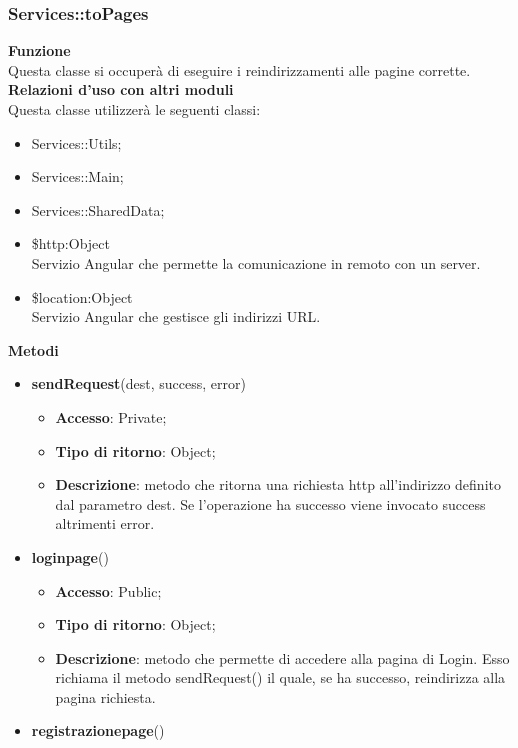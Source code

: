 \subsubsection{Services::toPages}{
		\label{sub:servicestoPages}
		\textbf{Funzione}\\
		\indent Questa classe si occuperà di eseguire i reindirizzamenti alle pagine corrette.\\
		\textbf{Relazioni d'uso con altri moduli}\\
		\indent Questa classe utilizzerà le seguenti classi:
		\begin{itemize}
			\item Services::Utils;
			\item Services::Main;
			\item Services::SharedData;
			\item \$http:Object\\
				\indent Servizio Angular che permette la comunicazione in remoto con un server.
			\item \$location:Object\\
				\indent Servizio Angular che gestisce gli indirizzi URL.
		\end{itemize}
		\textbf{Metodi}
		\begin{itemize}
			\item \textbf{sendRequest}(dest, success, error)
			\begin{itemize}
				\item \textbf{Accesso}: Private;
				\item \textbf{Tipo di ritorno}: Object;
				\item \textbf{Descrizione}: metodo che ritorna una richiesta http all'indirizzo definito dal parametro dest. Se l'operazione ha successo viene invocato success altrimenti error.
			\end{itemize}
			\item \textbf{loginpage}()
			\begin{itemize}
				\item \textbf{Accesso}: Public;
				\item \textbf{Tipo di ritorno}: Object;
				\item \textbf{Descrizione}: metodo che permette di accedere alla pagina di Login. Esso richiama il metodo sendRequest() il quale, se ha successo, reindirizza alla pagina richiesta.
			\end{itemize}
			\item \textbf{registrazionepage}()
			\begin{itemize}

\end{itemize}
\end{itemize}}
